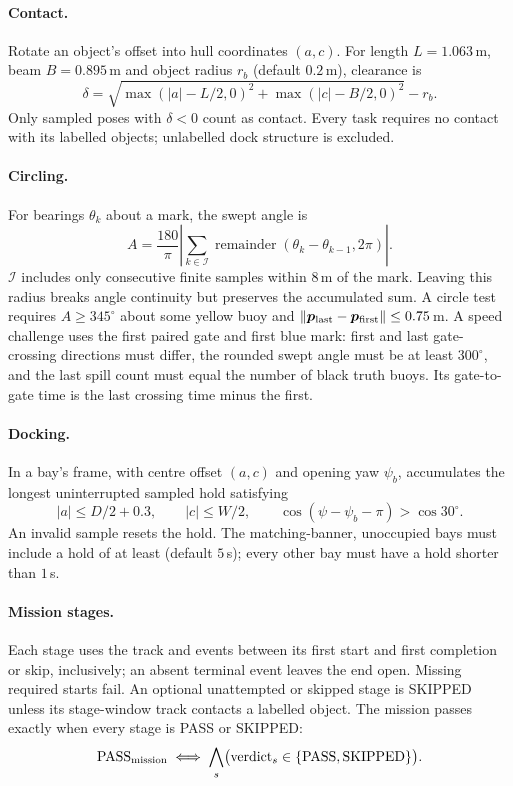 \paragraph{Contact.} Rotate an object's offset into hull coordinates $(a,c)$.
For length $L=1.063$\,m, beam $B=0.895$\,m and object radius $r_b$
(default $0.2$\,m), clearance is
\[
 \delta=\sqrt{\max(|a|-L/2,0)^2+\max(|c|-B/2,0)^2}-r_b.
\]
Only sampled poses with $\delta<0$ count as contact. Every task requires no
contact with its labelled objects; unlabelled dock structure is excluded.

\paragraph{Circling.} For bearings $\theta_k$ about a mark, the swept angle is
\[
 A=\frac{180}{\pi}\left|\sum_{k\in\mathcal I}
       \operatorname{remainder}(\theta_k-\theta_{k-1},2\pi)\right|.
\]
$\mathcal I$ includes only consecutive finite samples within $8$\,m of the
mark. Leaving this radius breaks angle continuity but preserves the accumulated
sum. A circle test requires $A\ge345^\circ$ about some yellow buoy and
$\|\bm p_{\rm last}-\bm p_{\rm first}\|\le0.75$\,m. A speed challenge uses
the first paired gate and first blue mark: first and last gate-crossing
directions must differ, the rounded swept angle must be at least $300^\circ$,
and the last spill count must equal the number of black truth buoys.
Its gate-to-gate time is the last crossing time minus the first.

\paragraph{Docking.} In a bay's frame, with centre offset $(a,c)$ and opening
yaw $\psi_b$,  accumulates the longest uninterrupted
sampled hold satisfying
\[
 |a|\le D/2+0.3,\qquad |c|\le W/2,\qquad
 \cos(\psi-\psi_b-\pi)>\cos30^\circ.
\]
An invalid sample resets the hold. The matching-banner, unoccupied bays must
include a hold of at least  (default $5$\,s); every other bay
must have a hold shorter than $1$\,s.

\paragraph{Mission stages.} Each stage uses the track and events between its
first start and first completion or skip, inclusively; an absent terminal event
leaves the end open. Missing required starts fail. An optional unattempted or
skipped stage is SKIPPED unless its stage-window track contacts a labelled
object. The mission passes exactly when every stage is PASS or SKIPPED:
\[
 \text{PASS}_{\rm mission}\iff
 \bigwedge_s\bigl(\text{verdict}_s\in\{\text{PASS},\text{SKIPPED}\}\bigr).
\]

